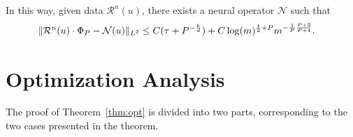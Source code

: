 \documentclass[preprint,12pt]{elsarticle}
\theoremstyle{plain}
\numberwithin{figure}{section}
\numberwithin{table}{section}
\begin{document}
In this way, given data $\mathcal{R}^n(u)$, there exists a neural operator $\mathcal{N}$ such that
\begin{equation}
	\begin{aligned}
		\|\mathcal{R}^n(u)\cdot\Phi_P-\mathcal{N}(u)\|_{L^2} 
		&\le C(\tau+P^{-{k\over d}}) +C\log(m)^{{1\over 2}+P}m^{-{1\over P}{P+2\over P+4}}.
	\end{aligned}
\end{equation}




\section{Optimization Analysis}\label{appdendix:opt}
The proof of Theorem~\ref{thm:opt} is divided into two parts, corresponding to the two cases presented in the theorem.
\end{document}
